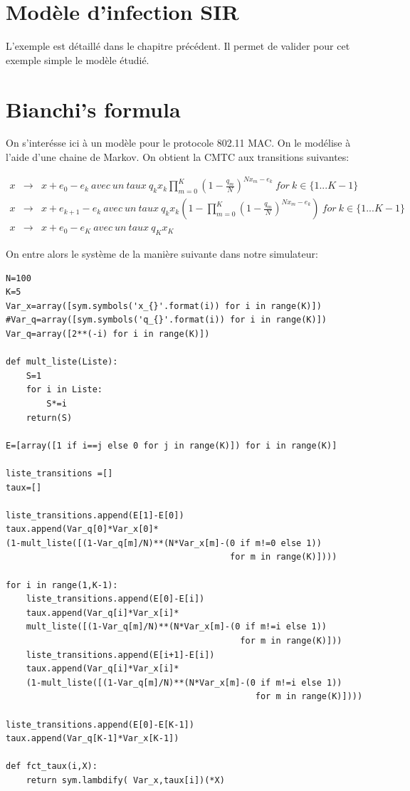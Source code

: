 \documentclass[a4paper,12pt]{report}
\begin{document}
\section{Modèle d'infection SIR}
L'exemple est détaillé dans le chapitre précédent. Il permet de
valider pour cet exemple simple le modèle étudié.

\section{Bianchi's formula}
On s'interésse ici à un modèle \cite{bianchi} pour le protocole 802.11 MAC. On le
modélise à l'aide d'une chaine de Markov. On obtient la CMTC aux transitions suivantes:

\begin{eqnarray*}
  x & \rightarrow & x+e_0-e_k \ avec\ un\ taux \
  q_kx_k\prod_{m=0}^K(1-\frac{q_m}{N})^{Nx_m-e_k} \ for \ k \in
                    \{1...K-1\} \\
  x & \rightarrow & x+e_{k+1}-e_k \ avec\ un\ taux \
  q_kx_k(1-\prod_{m=0}^K(1-\frac{q_m}{N})^{Nx_m-e_k}) \ for \ k \in
                    \{1...K-1\} \\
  x & \rightarrow & x+e_0-e_K \ avec \ un \ taux \ q_Kx_K
\end{eqnarray*}

On entre alors le système de la manière suivante dans notre
simulateur:

\newpage
\begin{lstlisting}[frame=single]
N=100
K=5
Var_x=array([sym.symbols('x_{}'.format(i)) for i in range(K)])
#Var_q=array([sym.symbols('q_{}'.format(i)) for i in range(K)])
Var_q=array([2**(-i) for i in range(K)])

def mult_liste(Liste):
    S=1
    for i in Liste:
        S*=i
    return(S)

E=[array([1 if i==j else 0 for j in range(K)]) for i in range(K)]

liste_transitions =[]
taux=[]

liste_transitions.append(E[1]-E[0])
taux.append(Var_q[0]*Var_x[0]*
(1-mult_liste([(1-Var_q[m]/N)**(N*Var_x[m]-(0 if m!=0 else 1)) 
                                            for m in range(K)])))

for i in range(1,K-1):
    liste_transitions.append(E[0]-E[i])
    taux.append(Var_q[i]*Var_x[i]*
    mult_liste([(1-Var_q[m]/N)**(N*Var_x[m]-(0 if m!=i else 1)) 
                                              for m in range(K)]))
    liste_transitions.append(E[i+1]-E[i])
    taux.append(Var_q[i]*Var_x[i]*
    (1-mult_liste([(1-Var_q[m]/N)**(N*Var_x[m]-(0 if m!=i else 1)) 
                                                 for m in range(K)])))

liste_transitions.append(E[0]-E[K-1])
taux.append(Var_q[K-1]*Var_x[K-1])

def fct_taux(i,X):
    return sym.lambdify( Var_x,taux[i])(*X)
\end{lstlisting}
\end{document}
